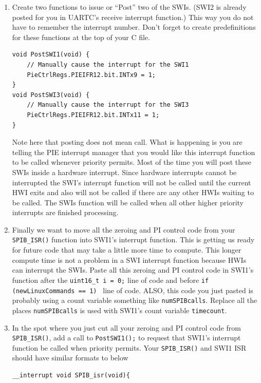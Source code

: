 \documentclass[11pt]{article}
\begin{document}
\begin{enumerate}
            SWI2 can be interrupted by all hardware interrupts (HWI) and SWI1. SWI2 can interrupt the \texttt{main()} \texttt{while(1)} loop and SWI3.
\begin{verbatim}
__interrupt void SWI3_LowestPriority(void)
\end{verbatim}
            SWI3 is currently not being used.

            SWI3 can be interrupted by all hardware interrupts (HWI), SWI1 and SWI2. SWI3 can interrupt the \texttt{main()} \texttt{while(1)} loop.
        \item Create two functions to issue or “Post” two of the SWIs. (SWI2 is already posted for you in UARTC’s receive interrupt function.) This way you do not have to remember the interrupt number. Don’t forget to create predefinitions for these functions at the top of your C file.
\begin{verbatim}
void PostSWI1(void) {
    // Manually cause the interrupt for the SWI1
    PieCtrlRegs.PIEIFR12.bit.INTx9 = 1;
}
void PostSWI3(void) {
    // Manually cause the interrupt for the SWI3
    PieCtrlRegs.PIEIFR12.bit.INTx11 = 1;
}
\end{verbatim}
            Note here that posting does not mean call. What is happening is you are telling the PIE interrupt manager that you would like this interrupt function to be called whenever priority permits. Most of the time you will post these SWIs inside a hardware interrupt. Since hardware interrupts cannot be interrupted the SWI’s interrupt function will not be called until the current HWI exits and also will not be called if there are any other HWIs waiting to be called. The SWIs function will be called when all other higher priority interrupts are finished processing.
            \item Finally we want to move all the zeroing and PI control code from your \texttt{SPIB_ISR()} function into SWI1’s interrupt function. This is getting us ready for future code that may take a little more time to compute. This longer compute time is not a problem in a SWI interrupt function because HWIs can interrupt the SWIs. Paste all this zeroing and PI control code in SWI1’s function after the \texttt{uint16_t i = 0;} line of code and before \texttt{if (newLinuxCommands == 1) \textbraceleft} line of code. ALSO, this code you just pasted is probably using a count variable something like \texttt{numSPIBcalls}. Replace all the places \texttt{numSPIBcalls} is used with SWI1’s count variable \texttt{timecount}.
            \item In the spot where you just cut all your zeroing and PI control code from \texttt{SPIB_ISR()}, add a call to \texttt{PostSWI1();} to request that SWI1’s interrupt function be called when priority permits. Your \texttt{SPIB_ISR()} and SWI1 ISR should have similar formats to below
\begin{verbatim}
__interrupt void SPIB_isr(void){


\end{verbatim}
\end{enumerate}
\end{document}
